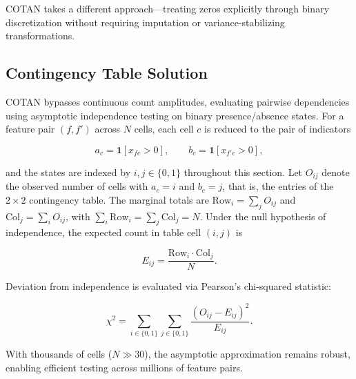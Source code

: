 COTAN takes a different approach—treating zeros explicitly through binary discretization without requiring imputation or variance-stabilizing transformations.

\subsection{Contingency Table Solution}
COTAN bypasses continuous count amplitudes, evaluating pairwise dependencies using asymptotic independence testing on binary presence/absence states\cite{galfre2021cotan}. For a feature pair $(f, f')$ across $N$ cells, each cell $c$ is reduced to the pair of indicators

$$a_c = \mathbf{1}[x_{fc} > 0], \qquad b_c = \mathbf{1}[x_{f'c} > 0],$$

and the states are indexed by $i, j \in \{0,1\}$ throughout this section. Let $O_{ij}$ denote the observed number of cells with $a_c = i$ and $b_c = j$, that is, the entries of the $2 \times 2$ contingency table. The marginal totals are $\mathrm{Row}_i = \sum_j O_{ij}$ and $\mathrm{Col}_j = \sum_i O_{ij}$, with $\sum_i \mathrm{Row}_i = \sum_j \mathrm{Col}_j = N$. Under the null hypothesis of independence, the expected count in table cell $(i,j)$ is

$$E_{ij} = \frac{\mathrm{Row}_i \cdot \mathrm{Col}_j}{N}.$$

Deviation from independence is evaluated via Pearson's chi-squared statistic\cite{galfre2021cotan}:

$$\chi^2 = \sum_{i \in \{0,1\}} \sum_{j \in \{0,1\}} \frac{(O_{ij} - E_{ij})^2}{E_{ij}}.$$

With thousands of cells ($N \gg 30$), the asymptotic approximation remains robust\cite{galfre2021cotan}, enabling efficient testing across millions of feature pairs.

